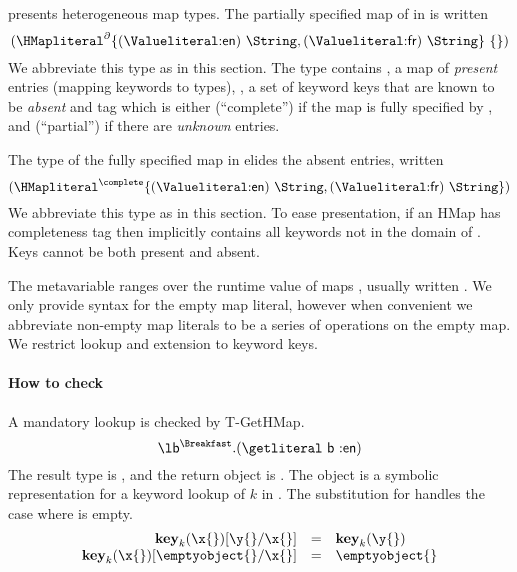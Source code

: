 presents
heterogeneous map types.
The partially specified map of
 in 
is written
$$
\HMapp{\mandatoryset{\mandatoryentrynoarrow{\Valkw{en}}{\String}, {\mandatoryentrynoarrow{\Valkw{fr}}{\String}}}}{\emptyabsent{}}
$$
We abbreviate this type as \Lunch in this section.
The type \HMapgeneric{\mandatory{}}{\absent{}}
contains {\mandatory{}}, a map of \emph{present} entries (mapping keywords to types),
\absent{}, a set of keyword keys that are known to be \emph{absent}
and
tag \completenessmeta{} which is either {\complete{}} (``complete'') if the map is fully specified by \mandatory{},
and {\partial{}} (``partial'') if there are \emph{unknown} entries.

The type of the fully specified map
 in  elides the absent entries,
written
$$
\HMapc{\mandatoryset{\mandatoryentrynoarrow{\Valkw{en}}{\String}, {\mandatoryentrynoarrow{\Valkw{fr}}{\String}}}}
$$
We abbreviate this type as \Breakfast in this section.
To ease presentation, 
if an HMap has completeness tag \complete{} then \absent{} implicitly contains all keywords not in the domain of \mandatory{}.
Keys cannot be both present and absent.

The metavariable \mapval{}
ranges over the runtime value of maps {\curlymapvaloverright{\k{}}{\v{}}},
usually written {\curlymapvaloverrightnoarrow{\k{}}{\v{}}}.
We %
only provide syntax for the empty map literal,
however when convenient we abbreviate non-empty map literals
to be a series of \assocliteral{} operations on the empty map.
We restrict lookup and extension to keyword keys. 

\paragraph{How to check}
A mandatory lookup is checked by T-GetHMap.
$$
\abs{\makelocal{b}}{\Breakfast}{\getexp{\makelocal{b}}{\makekw{en}}}
$$
The result type is \String, and the return object is .
The object { {\object{}} {\x{}}}
is a symbolic representation for a keyword lookup of $k$ in \object{}.
The substitution for {\x{}} handles the case where \object{} is empty.
$$
\begin{array}{rcl}
{\replacefor {\path {\keype{k}} {\x{}}} {\y{}} {\x{}}} &=& {\path {\keype{k}} {\y{}}} \\
{\replacefor {\path {\keype{k}} {\x{}}} {\emptyobject{}} {\x{}}} &=& \emptyobject{}
\end{array}
$$

